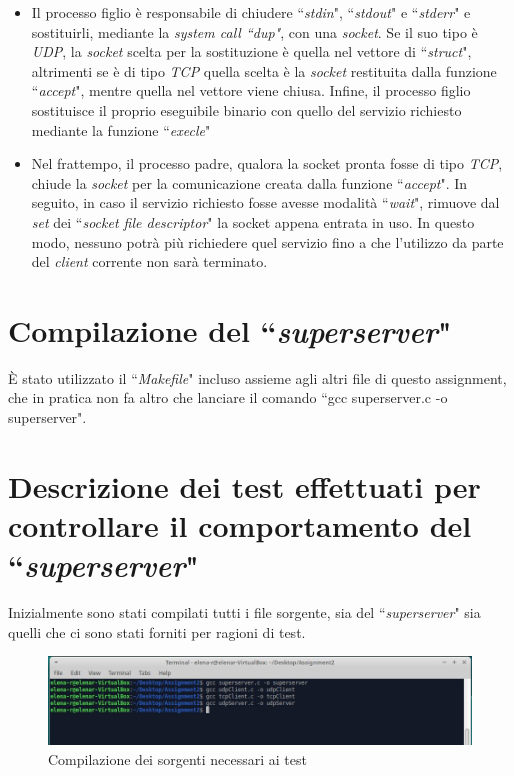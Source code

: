 \documentclass[a4paper, 12pt]{report}
\begin{document}
\begin{itemize}
    \item Il processo figlio è responsabile di chiudere ``\textit{stdin}", ``\textit{stdout}" e ``\textit{stderr}" e sostituirli, mediante la \textit{system call ``dup"},
    con una \textit{socket}. Se il suo tipo è \textit{UDP}, la \textit{socket} scelta per la sostituzione è quella nel vettore di ``\textit{struct}", altrimenti se è di tipo \textit{TCP}
    quella scelta è la \textit{socket} restituita dalla funzione ``\textit{accept}", mentre quella nel vettore viene chiusa. Infine, il processo figlio sostituisce il proprio
    eseguibile binario con quello del servizio richiesto mediante la funzione ``\textit{execle}"
    \item Nel frattempo, il processo padre, qualora la socket pronta fosse di tipo \textit{TCP}, chiude la \textit{socket} per la comunicazione creata dalla funzione ``\textit{accept}".
    In seguito, in caso il servizio richiesto fosse avesse modalità ``\textit{wait}", rimuove dal \textit{set} dei ``\textit{socket file descriptor}" la socket appena entrata in
    uso. In questo modo, nessuno potrà più richiedere quel servizio fino a che l'utilizzo da parte del \textit{client} corrente non sarà terminato. 
\end{itemize}

\section{Compilazione del ``\textit{superserver}"}

È stato utilizzato il ``\textit{Makefile}" incluso assieme agli altri file di questo assignment, che in pratica non fa altro che lanciare il comando ``gcc superserver.c
-o superserver".

\section{Descrizione dei test effettuati per controllare il comportamento del ``\textit{superserver}"}

Inizialmente sono stati compilati tutti i file sorgente, sia del ``\textit{superserver}" sia quelli che ci sono stati forniti per ragioni di test.

\begin{figure}[H]
	\centering
	\includegraphics[width=\linewidth]{images/gcc.JPG}
	\caption{Compilazione dei sorgenti necessari ai test}
\end{figure}
\end{document}
